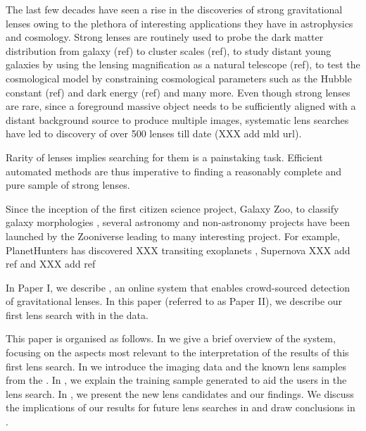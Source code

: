 \documentclass[useAMS,usenatbib,a4paper]{mn2e}
\begin{document}

The last few decades have seen a rise in the discoveries of strong
gravitational lenses owing to the plethora of interesting applications
they have in astrophysics and cosmology. Strong lenses are routinely
used to probe the dark matter distribution from galaxy (ref) to cluster
scales (ref), to  study distant young galaxies by using the lensing
magnification as a natural telescope (ref), to test the cosmological
model by constraining cosmological parameters such as the Hubble
constant (ref) and dark energy (ref) and many more. Even though strong
lenses are rare, since a foreground massive object needs to be
sufficiently aligned with a distant background source to produce
multiple images, systematic lens searches have led to discovery of over
500 lenses till date (XXX add mld url). 

Rarity of lenses implies searching for them is a painstaking task.
Efficient automated methods are thus imperative to finding a reasonably
complete and pure sample of strong lenses.   



Since the inception of the first citizen science project, Galaxy Zoo, to
classify galaxy morphologies \citep{LintottEtal2008}, several astronomy
and non-astronomy projects have been launched by the Zooniverse leading
to many interesting project. For example, PlanetHunters
has discovered XXX transiting exoplanets \citep{SchwambEtal2012},
Supernova XXX add ref and XXX add ref


In Paper I, we describe \sw, an online system that enables crowd-sourced
detection of gravitational lenses. In this paper (referred to as Paper
II), we describe our first lens search with \sw in the \cfhtls data.

This paper is organised as follows. In  we give a brief
overview of the \sw system, focusing on the aspects most relevant to the
interpretation of the results of this first lens search. In
 we introduce the \cfhtls imaging data and the known lens
samples from the \cfhtls. In , we explain the training sample
generated to aid the \sw users in the lens search. In
, we present the new lens candidates and our findings.
We discuss the implications of our results for future lens searches in
 and draw conclusions in .
\end{document}
